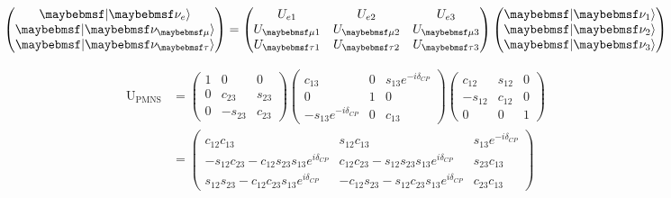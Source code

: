 \begin{gather} %
    \begin{pmatrix}
        \ket{\nu_{e}}   \\
        \ket{\nu_{\mu}} \\
        \ket{\nu_{\tau}}
    \end{pmatrix}
    =
    \begin{pmatrix}
        U_{e1}     & U_{e2}     & U_{e3}     \\
        U_{\mu 1}  & U_{\mu 2}  & U_{\mu 3}  \\
        U_{\tau 1} & U_{\tau 2} & U_{\tau 3}
    \end{pmatrix}
    \begin{pmatrix}
        \ket{\nu_{1}} \\
        \ket{\nu_{2}} \\
        \ket{\nu_{3}}
    \end{pmatrix}
\end{gather} %

\begin{align} %
    \mathrm{U}_{\mathrm{PMNS}} & =
    \begin{pmatrix}
        1 & 0       & 0      \\
        0 & c_{23}  & s_{23} \\
        0 & -s_{23} & c_{23}
    \end{pmatrix}
    \begin{pmatrix}
        c_{13}                   & 0 & s_{13}e^{-i\delta_{CP}} \\
        0                        & 1 & 0                       \\
        -s_{13}e^{-i\delta_{CP}} & 0 & c_{13}
    \end{pmatrix}
    \begin{pmatrix}
        c_{12}  & s_{12} & 0 \\
        -s_{12} & c_{12} & 0 \\
        0       & 0      & 1
    \end{pmatrix}
    \\
                               & =
    \begin{pmatrix}
        c_{12}c_{13}
         & s_{12}c_{13}
         & s_{13}e^{-i\delta_{CP}}                          \\
        -s_{12}c_{23}-c_{12}s_{23}s_{13}e^{i\delta_{CP}}
         & c_{12}c_{23}-s_{12}s_{23}s_{13}e^{i\delta_{CP}}
         & s_{23}c_{13}                                     \\
        s_{12}s_{23}-c_{12}c_{23}s_{13}e^{i\delta_{CP}}
         & -c_{12}s_{23}-s_{12}c_{23}s_{13}e^{i\delta_{CP}}
         & c_{23}c_{13}
    \end{pmatrix}
\end{align} %

